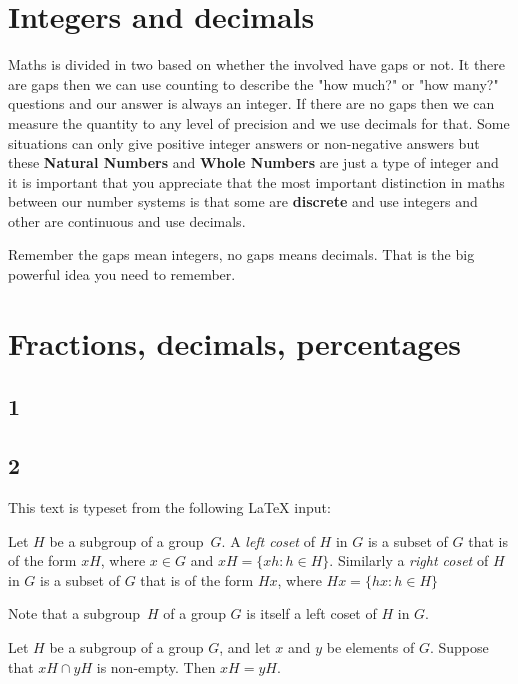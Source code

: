 \section{Integers and decimals}
Maths is divided in two based on whether the   involved have gaps or not. It there are gaps then we can use counting to  describe the  "how much?" or "how many?" questions and our answer is always an integer.  If there are no gaps then we can measure the quantity to any level of precision and we use decimals for that.  Some situations can only give positive integer answers or non-negative answers but these \textbf{Natural Numbers} and \textbf{Whole Numbers} are just a type of integer and it is important that you appreciate that the most important distinction in maths between our number systems is that some are \textbf{discrete} and use integers and other are continuous and use  decimals. 

Remember the gaps mean integers, no gaps means decimals. That is the big powerful idea you need to remember.
\section{Fractions, decimals, percentages  }


\subsection{1}

\subsection{2}


This text is typeset from the following LaTeX input:
\begin{definition}
Let $H$ be a subgroup of a group~$G$.  A \emph{left coset}
of $H$ in $G$ is a subset of $G$ that is of the form $xH$,
where $x \in G$ and $xH = \{ xh : h \in H \}$.
Similarly a \emph{right coset} of $H$ in $G$ is a subset
of $G$ that is of the form $Hx$, where
$Hx = \{ hx : h \in H \}$
\end{definition}

Note that a subgroup~$H$ of a group $G$ is itself a
left coset of $H$ in $G$.

\begin{lemma}
\label{LeftCosetsDisjoint}
Let $H$ be a subgroup of a group $G$, and let $x$ and $y$ be
elements of $G$.  Suppose that $xH \cap yH$ is non-empty.
Then $xH = yH$.
\end{lemma}


